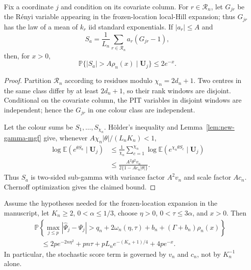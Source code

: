 \begin{lemma}
\label{lem:new-colour}
Fix a coordinate $j$ and condition on its covariate column. For
$r\in\mathcal R_n$, let $G_{jr}$ be the R\'enyi variable appearing in the
frozen-location local-Hill expansion; thus $G_{jr}$ has the law of a mean of
$k_r$ iid standard exponentials. If $|a_r|\le A$ and
\[
 S_a=\frac1{L_n}\sum_{r\in\mathcal R_n}a_r(G_{jr}-1),
\]
then, for $x>0$,
\[
 \mathbb P\{|S_a|>A\rho_n(x)\mid\boldsymbol U_j\}\le2e^{-x}.
\]
\end{lemma}

\begin{proof}
Partition $\mathcal R_n$ according to residues modulo
$\chi_n=2d_n+1$. Two centres in the same class differ by at least
$2d_n+1$, so their rank windows are disjoint. Conditional on the covariate
column, the PIT variables in disjoint windows are independent; hence the
$G_{jr}$ in one colour class are independent.

Let the colour sums be $S_1,\ldots,S_{\chi_n}$. H\"older's inequality and
Lemma~\ref{lem:new-gamma-mgf} give, whenever
$A\chi_n|\theta|/(L_nK_n)<1$,
\begin{align*}
 \log\mathbb E(e^{\theta S_a}\mid\boldsymbol U_j)
 &\le \frac1{\chi_n}\sum_{c=1}^{\chi_n}
       \log\mathbb E(e^{\chi_n\theta S_c}\mid\boldsymbol U_j)\\
 &\le
 \frac{A^2\theta^2v_n}
      {2\{1-Ac_n|\theta|\}}.
\end{align*}
Thus $S_a$ is two-sided sub-gamma with variance factor $A^2v_n$ and
scale factor $Ac_n$. Chernoff optimization gives the claimed bound.
\end{proof}

\begin{theorem}
\label{thm:new-score-finite}
Assume the hypotheses needed for the frozen-location expansion in the
manuscript, let $K_n\ge2$, $0<\alpha\le1/3$, choose $\eta>0$,
$0<\tau\le3\alpha$, and $x>0$. Then
\begin{align*}
 &\mathbb P\left\{
  \max_{j\le p}|\widehat\Psi_j-\Psi_j|
  >q_n+2\omega_n(\eta,\tau)+b_n+(\Gamma+b_n)\rho_n(x)
  \right\}\\
 &\quad\le
 2p e^{-2n\eta^2}
 +pn\tau
 +pL_n e^{-(K_n+1)/4}
 +4p e^{-x}.
\end{align*}
In particular, the stochastic score term is governed by $v_n$ and $c_n$,
not by $K_n^{-1}$ alone.
\end{theorem}

